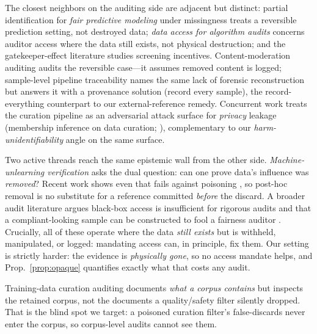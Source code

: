 \documentclass[conference]{IEEEtran}
\begin{document}
The closest neighbors on the auditing side are adjacent but distinct: partial
identification for \emph{fair predictive modeling} under missingness \cite{zhu2023} treats a reversible
prediction setting, not destroyed data; \emph{data access for algorithm audits} \cite{zaccour2025} concerns auditor access where the data still exists, not physical destruction; and the
gatekeeper-effect literature \cite{koren2023} studies screening incentives. Content-moderation auditing
\cite{truong2025} audits the reversible case---it assumes removed
content is logged; sample-level pipeline traceability \cite{chen2026} names the same lack of forensic
reconstruction but answers it with a provenance solution (record every sample), the record-everything
counterpart to our external-reference remedy. Concurrent work treats the curation pipeline as an adversarial attack
surface for \emph{privacy} leakage (membership inference on data curation; \cite{wahdany2026}), complementary to
our \emph{harm-unidentifiability} angle on the same surface.

Two active threads reach the same epistemic wall from the other side. \emph{Machine-unlearning verification}
asks the dual question: can one prove data's influence was \emph{removed}? Recent work shows even that fails
against poisoning \cite{pawelczyk2025}, so post-hoc removal is no substitute for a reference committed
\emph{before} the discard. A broader audit literature
argues black-box access is insufficient for rigorous audits \cite{casper2024} and that a compliant-looking
sample can be constructed to fool a fairness auditor \cite{lafargue2025}. Crucially, all of these operate
where the data \emph{still exists} but is withheld, manipulated, or logged: mandating access can, in principle,
fix them. Our setting is strictly harder: the evidence is \emph{physically gone}, so no access mandate helps, and
Prop.~\ref{prop:opaque} quantifies exactly what that costs any audit.

Training-data curation auditing \cite{dodge2021,bender2021,soldaini2024} documents \emph{what a corpus contains}
but inspects the retained corpus, not the documents a quality/safety filter silently dropped. That is the blind
spot we target: a poisoned curation filter's false-discards never enter the corpus, so corpus-level audits
cannot see them.
\end{document}
